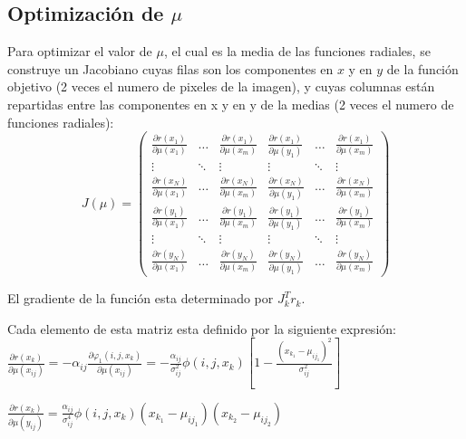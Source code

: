 \documentclass[10pt,journal,compsoc]{styles/IEEEtran}
\begin{document}
\subsection{Optimización de $\mu$}

Para optimizar el valor de $\mu$, el cual es la media de las funciones radiales, se construye un Jacobiano cuyas filas son los componentes en $x$ y en $y$ de la función objetivo (2 veces el numero de pixeles de la imagen), y cuyas columnas están repartidas entre las componentes en x y en y de la medias (2 veces el numero de funciones radiales):\\

\[J(\mu)= \left( \begin{array}{cccccc}
\frac{\partial r(x_1)}{\partial \mu(x_1)} & \ldots & \frac{\partial r(x_1)}{\partial \mu(x_m)} & \frac{\partial r(x_1)}{\partial \mu(y_1)} & \ldots & \frac{\partial r(x_1)}{\partial \mu(x_m)} \\
\vdots & \ddots & \vdots & \vdots & \ddots & \vdots \\

\frac{\partial r(x_N)}{\partial \mu(x_1)} & \ldots & \frac{\partial r(x_N)}{\partial \mu(x_m)} & \frac{\partial r(x_N)}{\partial \mu(y_1)} & \ldots & \frac{\partial r(x_N)}{\partial \mu(x_m)} \\
\frac{\partial r(y_1)}{\partial \mu(x_1)} & \ldots & \frac{\partial r(y_1)}{\partial \mu(x_m)} & \frac{\partial r(y_1)}{\partial \mu(y_1)} & \ldots & \frac{\partial r(y_1)}{\partial \mu(x_m)} \\
\vdots & \ddots & \vdots & \vdots & \ddots & \vdots \\

\frac{\partial r(y_N)}{\partial \mu(x_1)} & \ldots & \frac{\partial r(y_N)}{\partial \mu(x_m)} & \frac{\partial r(y_N)}{\partial \mu(y_1)} & \ldots & \frac{\partial r(y_N)}{\partial \mu(x_m)}
\end{array} \right)\] 

El gradiente de la función esta determinado por $J_k^Tr_k$. 

Cada elemento de esta matriz esta definido por la siguiente expresión:\\

\small 
$\frac{\partial r(x_k)}{\partial \mu(x_{ij})}=- \alpha_{ij} \frac{\partial \varphi_1(i,j,x_k)}{\partial \mu(x_{ij})} =- \frac{\alpha_{ij}}{\sigma_{ij}^2}\phi(i,j,x_k)[1-\frac{(x_{k_1}-\mu_{ij_1})^2}{\sigma_{ij}^2}] $\\
\normalsize

$\frac{\partial r(x_k)}{\partial \mu(y_{ij})}= \frac{\alpha_{ij}}{\sigma_{ij}^4}\phi(i,j,x_k)(x_{k_1}-\mu_{ij_1})(x_{k_2}-\mu_{ij_2})$\\
\end{document}
